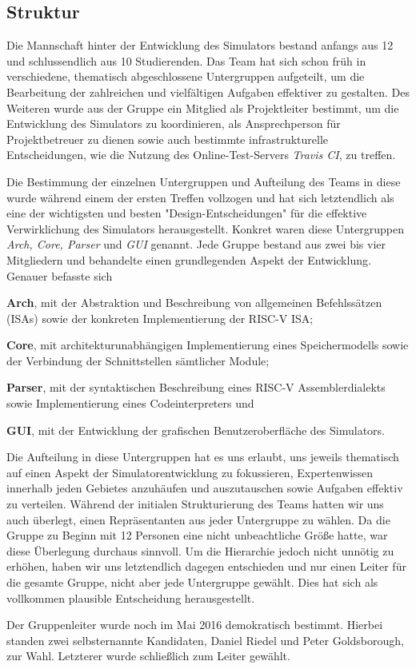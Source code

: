 
\subsection{Struktur}
\label{team:orga-structure}

Die Mannschaft hinter der Entwicklung des \erasim{} Simulators bestand anfangs
aus 12 und schlussendlich aus 10 Studierenden. Das Team hat sich schon früh in
verschiedene, thematisch abgeschlossene Untergruppen aufgeteilt, um die
Bearbeitung der zahlreichen und vielfältigen Aufgaben effektiver zu gestalten.
Des Weiteren wurde aus der Gruppe ein Mitglied als Projektleiter bestimmt, um
die Entwicklung des Simulators zu koordinieren, als Ansprechperson für
Projektbetreuer zu dienen sowie auch bestimmte infrastrukturelle Entscheidungen,
wie die Nutzung des Online-Test-Servers \emph{Travis CI}, zu treffen.

Die Bestimmung der einzelnen Untergruppen und Aufteilung des Teams in diese
wurde während einem der ersten Treffen vollzogen und hat sich letztendlich als
eine der wichtigsten und besten "Design-Entscheidungen" für die effektive
Verwirklichung des Simulators herausgestellt. Konkret waren diese Untergruppen
\emph{Arch, Core, Parser} und \emph{GUI} genannt. Jede Gruppe bestand aus zwei
bis vier Mitgliedern und behandelte einen grundlegenden Aspekt der Entwicklung.
Genauer befasste sich
\begin{sitemize}{-0.5cm}
  \item \textbf{Arch}, mit der Abstraktion und Beschreibung von allgemeinen Befehlssätzen (ISAs) sowie der konkreten Implementierung der RISC-V ISA;
  \item \textbf{Core}, mit architekturunabhängigen Implementierung eines Speichermodells sowie der Verbindung der Schnittstellen sämtlicher Module;
  \item \textbf{Parser}, mit der syntaktischen Beschreibung eines RISC-V Assemblerdialekts sowie Implementierung eines Codeinterpreters und
  \item \textbf{GUI}, mit der Entwicklung der grafischen Benutzeroberfläche des Simulators.
\end{sitemize}
\vspace{-0.4cm}

Die Aufteilung in diese Untergruppen hat es uns erlaubt, uns jeweils thematisch
auf einen Aspekt der Simulatorentwicklung zu fokussieren, Expertenwissen
innerhalb jeden Gebietes anzuhäufen und auszutauschen sowie Aufgaben effektiv zu
verteilen. Während der initialen Strukturierung des Teams hatten wir uns auch
überlegt, einen Repräsentanten aus jeder Untergruppe zu wählen. Da die Gruppe zu
Beginn mit 12 Personen eine nicht unbeachtliche Größe hatte, war diese
Überlegung durchaus sinnvoll. Um die Hierarchie jedoch nicht unnötig zu erhöhen,
haben wir uns letztendlich dagegen entschieden und nur einen Leiter für die
gesamte Gruppe, nicht aber jede Untergruppe gewählt. Dies hat sich als
vollkommen plausible Entscheidung herausgestellt.

Der Gruppenleiter wurde noch im Mai 2016 demokratisch bestimmt. Hierbei standen
zwei selbsternannte Kandidaten, Daniel Riedel und Peter Goldsborough, zur Wahl.
Letzterer wurde schließlich zum Leiter gewählt.

